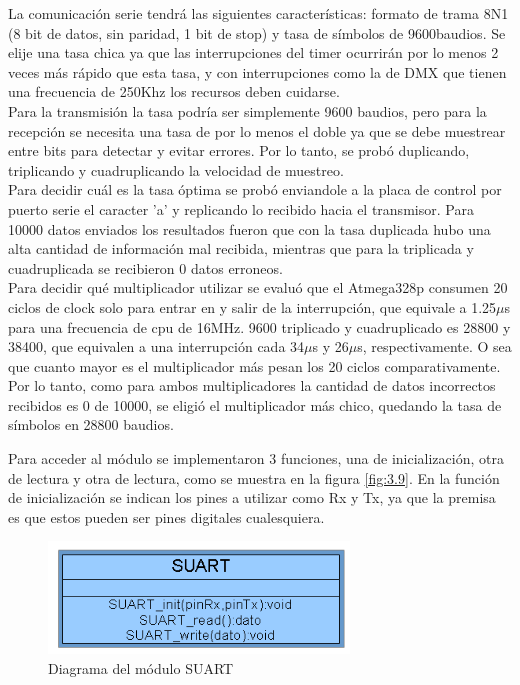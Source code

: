 La comunicación serie tendrá las siguientes características: formato de trama 8N1 (8 bit de datos, sin paridad, 1 bit de stop) y tasa de símbolos de 9600baudios. Se elije una tasa chica ya que las interrupciones del timer ocurrirán por lo menos 2 veces más rápido que esta tasa, y con interrupciones como la de DMX que tienen una frecuencia de 250Khz los recursos deben cuidarse.\\
Para la transmisión la tasa podría ser simplemente 9600 baudios, pero para la recepción se necesita una tasa de por lo menos el doble ya que se debe muestrear entre bits para detectar y evitar errores. Por lo tanto, se probó duplicando, triplicando y cuadruplicando la velocidad de muestreo. \\
Para decidir cuál es la tasa óptima se probó enviandole a la placa de control por puerto serie el caracter 'a' y replicando lo recibido hacia el transmisor. Para 10000 datos enviados los resultados fueron que con la tasa duplicada hubo una alta cantidad de información mal recibida, mientras que para la triplicada y cuadruplicada se recibieron 0 datos erroneos. \\
Para decidir qué multiplicador utilizar se evaluó que el Atmega328p consumen 20 ciclos de clock solo para entrar en y salir de la interrupción, que equivale a 1.25\(\mu\)s para una frecuencia de cpu de 16MHz. 9600 triplicado y cuadruplicado es 28800 y 38400, que equivalen a una interrupción cada 34\(\mu\)s y 26\(\mu\)s, respectivamente. O sea que cuanto mayor es el multiplicador más pesan los 20 ciclos comparativamente. Por lo tanto, como para ambos multiplicadores la cantidad de datos incorrectos recibidos es 0 de 10000, se eligió el multiplicador más chico, quedando la tasa de símbolos en 28800 baudios.

Para acceder al módulo se implementaron 3 funciones, una de inicialización, otra de lectura y otra de lectura, como se muestra en la figura \ref{fig:3.9}. En la función de inicialización se indican los pines a utilizar como Rx y Tx, ya que la premisa es que estos pueden ser pines digitales cualesquiera.

\begin{figure}[!ht]
	\centering
	\includegraphics[width=8cm,scale=1]{resources/3_9-moduloSUART.png}
	\caption{Diagrama del módulo SUART}
	\label{fig:\thefigure}
\end{figure}

